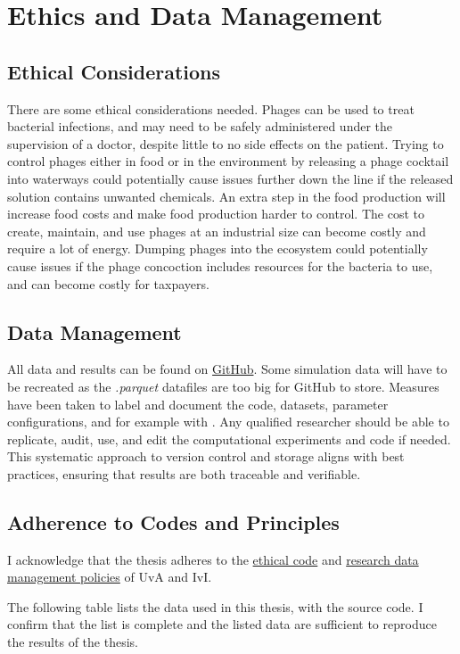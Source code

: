 \chapter{Ethics and Data Management}
\label{edm}
\section{Ethical Considerations}
There are some ethical considerations needed. 
Phages can be used to treat bacterial infections, and may need to be safely administered under the supervision of a doctor, despite little to no side effects on the patient. 
Trying to control phages either in food or in the environment by releasing a phage cocktail into waterways could potentially cause issues further down the line if the released solution contains unwanted chemicals. 
An extra step in the food production will increase food costs and make food production harder to control. 
The cost to create, maintain, and use phages at an industrial size can become costly and require a lot of energy. 
Dumping phages into the ecosystem could potentially cause issues if the phage concoction includes resources for the bacteria to use, and can become costly for taxpayers. 

\section{Data Management}
All data and results can be found on \href{https://github.com/BiggusVickus/Master-Thesis}{GitHub}. 
Some simulation data will have to be recreated as the \textit{.parquet} datafiles are too big for GitHub to store. 
Measures have been taken to label and document the code, datasets, parameter configurations, and for example with . 
Any qualified researcher should be able to replicate, audit, use, and edit the computational experiments and code if needed. 
This systematic approach to version control and storage aligns with best practices, ensuring that results are both traceable and verifiable. 

\section{Adherence to Codes and Principles}
I acknowledge that the thesis adheres to the \href{https://student.uva.nl/en/topics/ethics-in-research}{ethical code} and \href{https://rdm.uva.nl/en}{research data management policies} of UvA and IvI.

The following table lists the data used in this thesis, with the source code. 
I confirm that the list is complete and the listed data are sufficient to reproduce the results of the thesis. 

